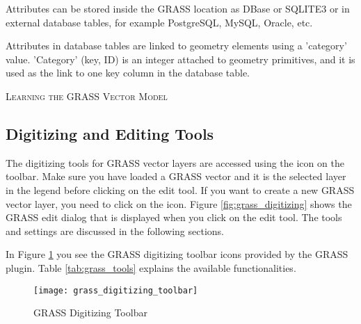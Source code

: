 Attributes can be stored inside the GRASS location as DBase or SQLITE3 or in
external database tables, for example PostgreSQL, MySQL, Oracle,
etc.

Attributes in database tables are linked to geometry elements using
a 'category' value. 'Category' (key, ID) is an
integer attached to geometry primitives, and it is used as the link to one
key column in the database table.

\begin{Tip}\caption{\textsc{Learning the GRASS Vector Model}}
\end{Tip} 

\subsection{Digitizing and Editing Tools}
\label{grass_digitising}

The digitizing tools for GRASS vector layers are accessed using the
 icon on the toolbar. Make sure
you have loaded a GRASS vector and it is the selected layer in the legend before
clicking on the edit tool. If you want to create a new GRASS vector layer, 
you need to click on the  icon. Figure \ref{fig:grass_digitizing} shows the GRASS edit dialog
that is displayed when you click on the edit tool. The tools and settings are
discussed in the following sections.

\label{label_grasstoolbar}

In Figure \ref{fig:grass_digitizing_toolbar} you see the GRASS digitizing
toolbar icons provided by the GRASS plugin. Table \ref{tab:grass_tools}
explains the available functionalities.

\begin{figure}[h]
   \begin{center}
   \caption{GRASS Digitizing Toolbar \nixcaption}\label{fig:grass_digitizing_toolbar} 
   \texttt{[image: grass\_digitizing\_toolbar]}
\end{center}  
\end{figure}

